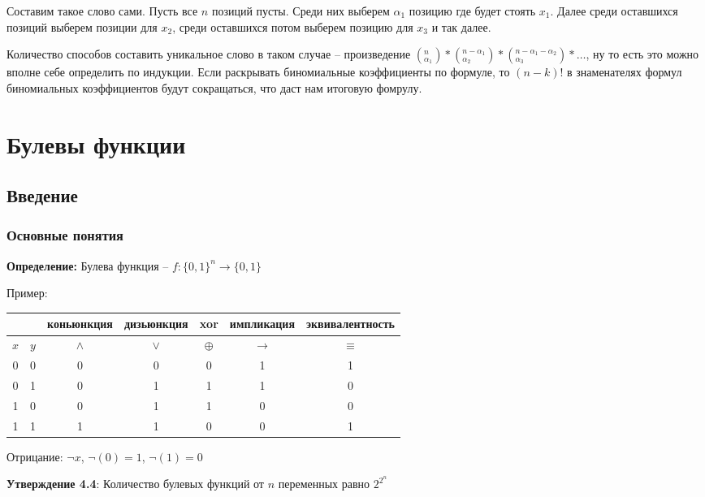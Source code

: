 \documentclass[openany]{article}
\begin{document}
   Составим такое слово сами. Пусть все $n$ позиций пусты. Среди них выберем $\alpha_1$ позицию где будет стоять $x_1$. Далее среди оставшихся позиций выберем позиции для $x_2$, среди оставшихся потом выберем позицию для $x_3$ и так далее.

   Количество способов составить уникальное слово в таком случае -- произведение $({}_{\alpha_1}^{n}) * ({}_{\alpha_2}^{n - \alpha_1}) * ({}_{\alpha_3}^{n - \alpha_1 - \alpha_2}) * \ldots$, ну то есть это можно вполне себе определить по индукции. Если раскрывать биномиальные коэффициенты по формуле, то $(n - k)!$ в знаменателях формул биномиальных коэффициентов будут сокращаться, что даст нам итоговую фомрулу.

   \section{Булевы функции}

   \subsection{Введение}

   \subsubsection{Основные понятия}

   \textbf{Определение:} Булева функция -- $f: \{0, 1\}^n \rightarrow \{0, 1\}$

   Пример:

   \begin{tabular}{|c|c|c|c|c|c|c|}
       \hline
       {} & {} & коньюнкция & дизьюнкция & xor & импликация & эквивалентность \\
       \hline
       $x$ & $y$ & $\wedge$ & $\vee$ & $\oplus$ & $\rightarrow$ & $\equiv$ \\
       \hline
       0 & 0 & 0 & 0 & 0 & 1 & 1 \\
       \hline
       0 & 1 & 0 & 1 & 1 & 1 & 0 \\
       \hline
       1 & 0 & 0 & 1 & 1 & 0 & 0 \\
       \hline
       1 & 1 & 1 & 1 & 0 & 0 & 1 \\
       \hline
   \end{tabular}

   Отрицание: $\neg x$, $\neg (0) = 1$, $\neg (1) = 0$

   \textbf{Утверждение 4.4}: Количество булевых функций от $n$ переменных равно $2^{2^n}$
\end{document}
